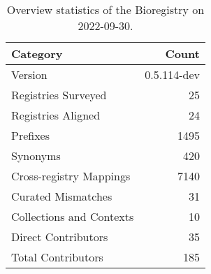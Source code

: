 \begin{table}
\centering
\caption{Overview statistics of the Bioregistry on 2022-09-30.}
\label{tab:bioregistry-summary}
\begin{tabular}{lr}
\toprule
                Category &       Count \\
\midrule
                 Version & 0.5.114-dev \\
     Registries Surveyed &          25 \\
      Registries Aligned &          24 \\
                Prefixes &        1495 \\
                Synonyms &         420 \\
 Cross-registry Mappings &        7140 \\
      Curated Mismatches &          31 \\
Collections and Contexts &          10 \\
     Direct Contributors &          35 \\
      Total Contributors &         185 \\
\bottomrule
\end{tabular}
\end{table}
